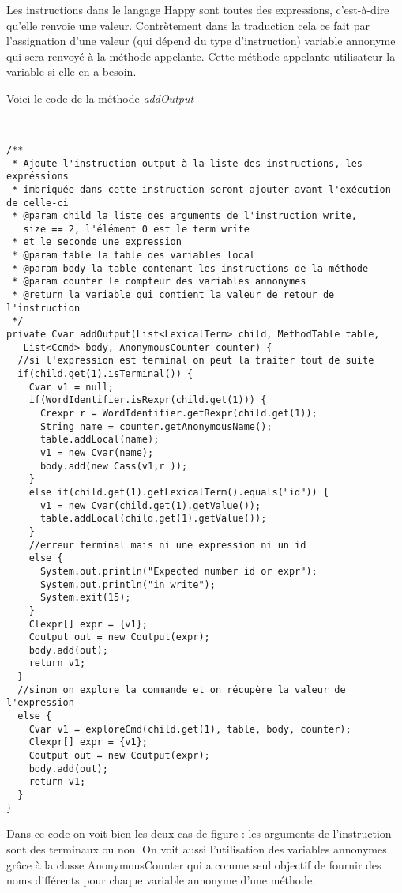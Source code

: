 Les instructions dans le langage Happy sont toutes des expressions, c'est-à-dire qu'elle renvoie une valeur. Contrètement dans la traduction
cela ce fait par l'assignation d'une valeur (qui dépend du type d'instruction) variable annonyme qui sera renvoyé à la méthode appelante. Cette méthode
appelante utilisateur la variable si elle en a besoin.

Voici le code de la méthode \textit{addOutput}
{\tiny
\begin{verbatim}

 
/**
 * Ajoute l'instruction output à la liste des instructions, les expréssions
 * imbriquée dans cette instruction seront ajouter avant l'exécution de celle-ci
 * @param child la liste des arguments de l'instruction write, 
   size == 2, l'élément 0 est le term write
 * et le seconde une expression
 * @param table la table des variables local
 * @param body la table contenant les instructions de la méthode 
 * @param counter le compteur des variables annonymes
 * @return la variable qui contient la valeur de retour de l'instruction
 */
private Cvar addOutput(List<LexicalTerm> child, MethodTable table,
   List<Ccmd> body, AnonymousCounter counter) {
  //si l'expression est terminal on peut la traiter tout de suite
  if(child.get(1).isTerminal()) {
    Cvar v1 = null;
    if(WordIdentifier.isRexpr(child.get(1))) {
      Crexpr r = WordIdentifier.getRexpr(child.get(1)); 
      String name = counter.getAnonymousName(); 
      table.addLocal(name);
      v1 = new Cvar(name);				
      body.add(new Cass(v1,r ));
    }
    else if(child.get(1).getLexicalTerm().equals("id")) {
      v1 = new Cvar(child.get(1).getValue());
      table.addLocal(child.get(1).getValue());
    }
    //erreur terminal mais ni une expression ni un id
    else {
      System.out.println("Expected number id or expr");
      System.out.println("in write");
      System.exit(15);
    }
    Clexpr[] expr = {v1};
    Coutput out = new Coutput(expr);
    body.add(out);
    return v1;
  }
  //sinon on explore la commande et on récupère la valeur de l'expression
  else {
    Cvar v1 = exploreCmd(child.get(1), table, body, counter);
    Clexpr[] expr = {v1};
    Coutput out = new Coutput(expr);
    body.add(out);
    return v1;
  }
}
 \end{verbatim}
}
Dans ce code on voit bien les deux cas de figure : les arguments de l'instruction sont des terminaux ou non. 
On voit aussi l'utilisation des variables annonymes grâce à la classe AnonymousCounter qui a comme seul objectif de fournir des noms différents
pour chaque variable annonyme d'une méthode. 

